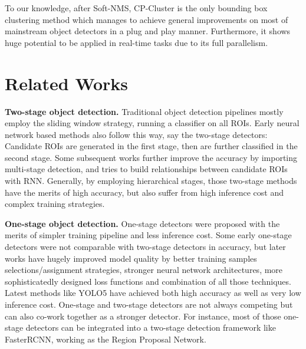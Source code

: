 \documentclass[10pt,twocolumn,letterpaper]{article}
\begin{document}
To our knowledge, after Soft-NMS\cite{bodla2017soft}, CP-Cluster is the only bounding box clustering method which manages to achieve general improvements on most of mainstream object detectors in a plug and play manner.
Furthermore, it shows huge potential to be applied in real-time tasks due to its full parallelism.
\section{Related Works}
\label{sec:related_work}
\textbf{Two-stage object detection.} Traditional object detection pipelines mostly employ the sliding window strategy, running a classifier on all ROIs.
Early neural network based methods also follow this way, say the two-stage detectors\cite{girshick2014rich,girshick2015fast,ren2015faster,dai2016r,zhou2021probabilistic}: Candidate ROIs are generated in the first stage, then are further classified in the second stage.
Some subsequent works further improve the accuracy by importing multi-stage detection\cite{cai2018cascade,xiang2017joint}, and \cite{pang2019libra} tries to build relationships between candidate ROIs with RNN. Generally, by employing hierarchical stages, those two-stage methods have the merits of high accuracy, but also suffer from high inference cost and complex training strategies.

\textbf{One-stage object detection.} One-stage detectors\cite{liu2016ssd,fu2017dssd,he2015spatial,lin2017focal,redmon2016you,redmon2017yolo9000,redmon2018yolov3,bochkovskiy2020yolov4,wang2021scaled,tian2019fcos} were proposed with the merits of simpler training pipeline and less inference cost. Some early one-stage detectors were not comparable with two-stage detectors in accuracy, but later works have hugely improved model quality by better training samples selections/assignment strategies\cite{zhang2020bridging,zhu2020autoassign},
stronger neural network architectures\cite{fu2017dssd,redmon2018yolov3,tan2020efficientdet,woo2018cbam}, more sophisticatedly designed loss functions\cite{rezatofighi2019generalized,zheng2020distance,lin2017focal,li2020generalized} and combination of all those techniques\cite{zhang2018single,bochkovskiy2020yolov4,wang2021scaled,21yolov5,tian2019fcos}. Latest methods like YOLO5\cite{21yolov5} have achieved both high accuracy as well as very low inference cost.
One-stage and two-stage detectors are not always competing but can also co-work together as a stronger detector.
For instance, most of those one-stage detectors can be integrated into a two-stage detection framework like FasterRCNN\cite{ren2015faster}, working as the Region Proposal Network\cite{zhou2021probabilistic}.
\end{document}
